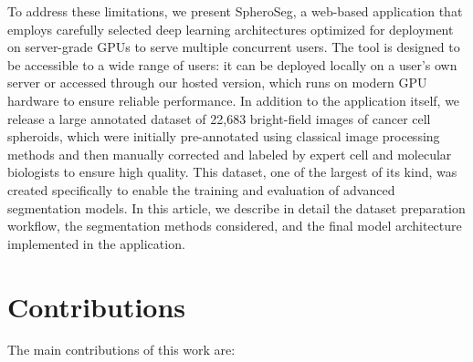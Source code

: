 \documentclass[preprint,12pt]{elsarticle}
\newcommand{\app}{SpheroSeg}
\begin{document}
To address these limitations, we present \app{}, a web-based application that employs carefully selected deep learning architectures optimized for deployment on server-grade GPUs to serve multiple concurrent users. The tool is designed to be accessible to a wide range of users: it can be deployed locally on a user's own server or accessed through our hosted version, which runs on modern GPU hardware to ensure reliable performance. In addition to the application itself, we release a large annotated dataset of 22,683 bright-field images of cancer cell spheroids, which were initially pre-annotated using classical image processing methods and then manually corrected and labeled by expert cell and molecular biologists to ensure high quality. This dataset, one of the largest of its kind, was created specifically to enable the training and evaluation of advanced segmentation models. In this article, we describe in detail the dataset preparation workflow, the segmentation methods considered, and the final model architecture implemented in the application.



\section{Contributions}
\label{sec:contributions}

The main contributions of this work are:
\end{document}
